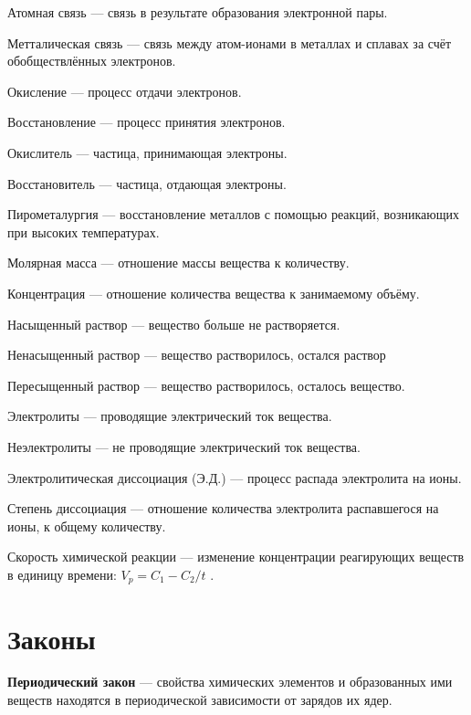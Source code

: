 \documentclass[a4paper, 12pt]{article}
\newcommand{\tbf}{\textbf}
\begin{document}
        Атомная связь --- связь в результате образования электронной пары.
        
        Метталическая связь --- связь между атом-ионами в металлах и сплавах за счёт обобществлённых электронов.
        
        Окисление --- процесс отдачи электронов.
        
        Восстановление --- процесс принятия электронов.
        
        Окислитель --- частица, принимающая электроны.
        
        Восстановитель --- частица, отдающая электроны.
        
        Пирометалургия --- восстановление металлов с помощью реакций, возникающих при высоких температурах.
        
        Молярная масса --- отношение массы вещества к количеству.

        Концентрация --- отношение количества вещества к занимаемому объёму.
        
        Насыщенный раствор --- вещество больше не растворяется.
        
        Ненасыщенный раствор --- вещество растворилось, остался раствор
        
        Пересыщенный раствор --- вещество растворилось, осталось вещество.
        
        Электролиты --- проводящие электрический ток вещества.
        
        Неэлектролиты --- не проводящие электрический ток вещества.
        
        Электролитическая диссоциация (Э.Д.) --- процесс распада электролита на ионы.
        
        Степень диссоциация --- отношение количества электролита распавшегося на ионы, к общему количеству.
        	    
      	Скорость химической реакции --- изменение концентрации реагирующих веществ в единицу времени: $V_{p}=C_{1}-C_{2}/t$ .

\section{Законы}
		
        \tbf{Периодический закон} --- свойства химических элементов и образованных ими веществ находятся  в периодической зависимости от зарядов их ядер.

        
\end{document}
